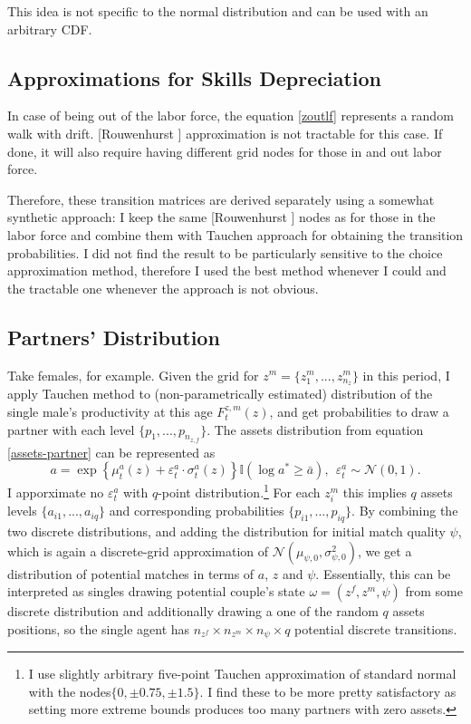 \documentclass[12pt,letter]{article}
\newcommand{\I}{\mathbb{I}}
\begin{document}
This idea is not specific to the normal distribution and can be used with an arbitrary CDF.

\subsection{Approximations for Skills Depreciation}

In case of being out of the labor force, the equation \ref{zoutlf} represents a random walk with drift. [Rouwenhurst ] approximation is not tractable for this case. If done, it will also require having different grid nodes for those in and out labor force.

Therefore, these transition matrices are derived separately using a somewhat synthetic approach: I keep the same [Rouwenhurst ] nodes as for those in the labor force and combine them with Tauchen approach for obtaining the transition probabilities. I did not find the result to be particularly sensitive to the choice approximation method, therefore I used the best method whenever I could and the tractable one whenever the approach is not obvious.

\subsection{Partners' Distribution}
Take females, for example. Given the grid for $z^m = \{z^m_1,...,z^m_{n_z}\}$ in this period, I apply Tauchen method to (non-parametrically estimated) distribution of the single male's productivity at this age $F^{z,m}_t(z)$, and get probabilities to draw a partner with each level $\{p_1,...,p_{n_{z,f}} \}$. The assets distribution from equation \ref{assets-partner} can be represented as \[a = \exp\left\{ \mu^a_t(z) + \varepsilon^a_t\cdot \sigma^{a}_t(z)  \right\}\I(\log a^* \geq \bar{a}),\ \  \varepsilon^a_t \sim \mathcal{N}(0,1).\] I apporximate no $\varepsilon^a_t$ with $q$-point distribution.\footnote{I use slightly arbitrary five-point Tauchen approximation of standard normal with the nodes$\{0,\pm 0.75,\pm 1.5\}$. I find these to be more pretty satisfactory as setting more extreme bounds produces too many partners with zero assets.}  For each $z^m_i$ this implies $q$ assets levels $\{a_{i1},...,a_{iq}\}$ and corresponding probabilities  $\{p_{i1},...,p_{iq}\}$. By combining the two discrete distributions, and adding the distribution for initial match quality $\psi$, which is again a discrete-grid approximation of $\mathcal{N}(\mu_{\psi,0},\sigma^2_{\psi,0})$, we get a distribution of potential matches in terms of $a$, $z$ and $\psi$. Essentially, this can be interpreted as singles drawing potential couple's state $\omega = (z^f,z^m,\psi)$ from some discrete distribution and additionally drawing a one of the random $q$ assets positions, so the single agent has $n_{z^f}\times n_{z^m} \times n_{\psi} \times q$ potential discrete transitions.
\end{document}

